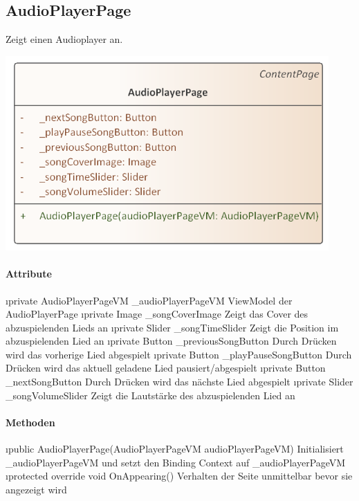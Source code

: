 \documentclass[../entwurf.tex]{subfiles}
\begin{document}
\subsection{AudioPlayerPage}
Zeigt einen Audioplayer an.
\begin{center}
	\includegraphics[page=1,width=350pt,keepaspectratio]{../uml_klassen/View/AudioPlayerPage.png}
\end{center}
\paragraph{Attribute}
\begin{itemize}
	\i{private AudioPlayerPageVM \_audioPlayerPageVM} ViewModel der AudioPlayerPage
	\i{private Image \_songCoverImage} Zeigt das Cover des abzuspielenden Lieds an
	\i{private Slider \_songTimeSlider} Zeigt die Position im abzuspielenden Lied an
	\i{private Button \_previousSongButton} Durch Drücken wird das vorherige Lied abgespielt
	\i{private Button \_playPauseSongButton} Durch Drücken wird das aktuell geladene Lied pausiert/abgespielt
	\i{private Button \_nextSongButton} Durch Drücken wird das nächste Lied abgespielt
	\i{private Slider \_songVolumeSlider} Zeigt die Lautstärke des abzuspielenden Lied an
\end{itemize}

\paragraph{Methoden}

\begin{itemize}
	\i{public AudioPlayerPage(AudioPlayerPageVM audioPlayerPageVM)} Initialisiert \_audioPlayerPageVM und setzt den Binding Context 			auf \_audioPlayerPageVM
	\i{protected override void OnAppearing()} Verhalten der Seite unmittelbar bevor sie angezeigt wird
\end{itemize}
\end{document}
